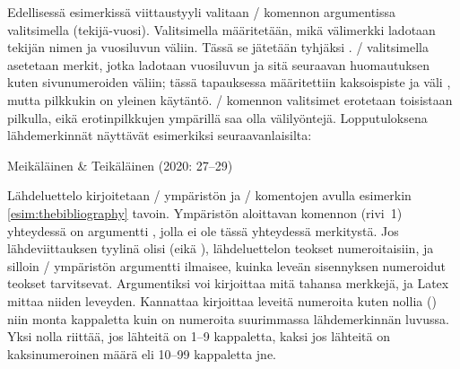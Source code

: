 \begin{koodilohkosis}
  \usepackage{natbib}
\end{koodilohkosis}

Edellisessä esimerkissä viittaustyyli valitaan \-/
komennon argumentissa valitsimella 
(tekijä\--vuosi). Valitsimella  määritetään, mikä
välimerkki ladotaan tekijän nimen ja vuosiluvun väliin. Tässä se
jätetään tyhjäksi \koodi{\{\}}. \-/ valitsimella
asetetaan merkit, jotka ladotaan vuosiluvun ja sitä seuraavan
huomautuksen kuten sivunumeroiden väliin; tässä tapauksessa määritettiin
kaksoispiste ja väli \koodi{\{:~\}}, mutta pilkkukin on yleinen
käytäntö. \-/ komennon valitsimet erotetaan
toisistaan pilkulla, eikä erotinpilkkujen ympärillä saa olla
välilyöntejä. Lopputuloksena lähdemerkinnät näyttävät esimerkiksi
seuraavanlaisilta:

\begin{koodilohkosis}
  \citet*[27--29]{johdatus} %
\end{koodilohkosis}

\begin{tulossis}
  Meikäläinen \& Teikäläinen (2020: 27--29)
\end{tulossis}

Lähdeluettelo kirjoitetaan \-/ ympäristön ja
\-/ komentojen avulla esimerkin
\ref{esim:thebibliography} tavoin. Ympäristön aloittavan komennon
(rivi~1) yhteydessä on argumentti , jolla ei ole tässä
yhteydessä merkitystä. Jos lähdeviittauksen tyylinä olisi
 (eikä ), lähdeluettelon teokset
numeroitaisiin, ja silloin \-/ ympäristön
argumentti ilmaisee, kuinka leveän sisennyksen numeroidut teokset
tarvitsevat. Argumentiksi voi kirjoittaa mitä tahansa merkkejä, ja Latex
mittaa niiden leveyden. Kannattaa kirjoittaa leveitä numeroita kuten
nollia () niin monta kappaletta kuin on numeroita suurimmassa
lähdemerkinnän luvussa. Yksi nolla riittää, jos lähteitä on 1--9
kappaletta, kaksi jos lähteitä on kaksinumeroinen määrä eli 10--99
kappaletta jne.

